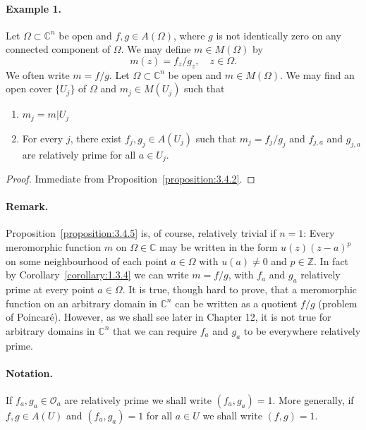 \paragraph*{Example 1.} Let $\Omega\subset\mathbb C^n$ be open and $f,g\in A(\Omega)$, where $g$ is not identically zero on any connected component of $\Omega$. We may define $m\in M(\Omega)$ by
\[m(z)=f_z/g_z,\quad z\in\Omega.\]
We often write $m=f/g$.
 Let $\Omega\subset\mathbb C^n$ be open and $m\in M(\Omega)$. We may find an open cover $\{U_j\}$ of $\Omega$ and $m_j\in M(U_j)$ such that
\begin{enumerate}
\item $m_j=m|U_j$
\item For every $j$, there exist $f_j,g_j\in A(U_j)$ such that $m_j=f_j/g_j$ and $f_{j,a}$ and $g_{j,a}$ are relatively prime for all $a\in U_j$.
\end{enumerate}
\begin{proof}Immediate from Proposition~\ref{proposition:3.4.2}.\end{proof}
\paragraph*{Remark.} Proposition~\ref{proposition:3.4.5} is, of course, relatively trivial if $n=1$: Every meromorphic function $m$ on $\Omega\in\mathbb C$ may be written in the form $u(z)(z-a)^p$ on some neighbourhood of each point $a\in\Omega$ with $u(a)\ne0$ and $p\in\mathbb Z$. In fact by Corollary~\ref{corollary:1.3.4} we can write $m=f/g$, with $f_a$ and $g_a$ relatively prime at every point $a\in\Omega$. It is true, though hard to prove, that a meromorphic function on an arbitrary domain in $\mathbb C^n$ can be written as a quotient $f/g$ (problem of Poincar\'e). However, as we shall see later in Chapter 12, it is not true for arbitrary domains in $\mathbb C^n$ that we can require $f_a$ and $g_a$ to be everywhere relatively prime.
\paragraph*{Notation.} If $f_a,g_a\in\mathcal O_a$ are relatively prime we shall write $(f_a,g_a)=1$. More generally, if $f,g\in A(U)$ and $(f_a,g_a)=1$ for all $a\in U$ we shall write $(f,g)=1$.

